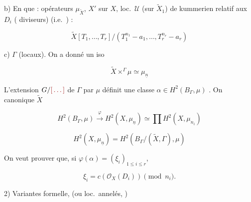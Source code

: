 \documentclass[11pt,a4paper]{article}
\begin{document}
b) En  que \ill{} : opérateurs $\mu_{\tilde{X}}$, $X'$ \ill{}
sur $X$, \ill{} loc.\ $\mathcal{U}$ (sur $\tilde{X}_{1}$) de 
kummerien relatif aux \ill{} \ill{} $D_{i}$ \ill{} (\ill{} \ill{} diviseurs)
(i.e.\ \ill{}) :

\[ \tilde{X}[T_{1}, \ldots, T_{r}] \big/ \left(T_{1}^{n_{1}} - a_{1}, \ldots,
T_{r}^{n_{r}} - a_{r}\right) \]

c) $\Gamma$  (locaux). On a donné
un iso

\[ \tilde{X} \times^{\Gamma} \mu \simeq \mu_{\underline{n}} \]

L'extension $G/\ill$ de $\Gamma$ par $\mu$ définit une classe $\alpha \in
H^{2}(B_{\Gamma}, \mu)$ . On
\ill{} \ill{} \ill{} canonique \ill{} \ill{} $\tilde{X}$

\[ H^{2}(B_{\Gamma}, \mu) \xrightarrow{\;\varphi\;} H^{2}(X, \mu_{\underline{n}})
\simeq \prod H^{2}(X, \mu_{n_{i}}) \]

\[ H^{2}(X, \mu_{\underline{n}}) = H^{2}\!\left(B_{\Gamma}/(\tilde{X}, \Gamma),
\mu\right) \]

On veut prouver que, si $\varphi(\alpha) = (\xi_{i})_{1 \leqslant i \leqslant
r}$,

\[ \xi_{i} = c\!\left(\mathcal{O}_{X}(D_{i})\right) \pmod{n_{i}}. \]


2) Variantes \ill{} formelle, (ou \ill{} loc.\ annelés, \ill{})

\end{document}

